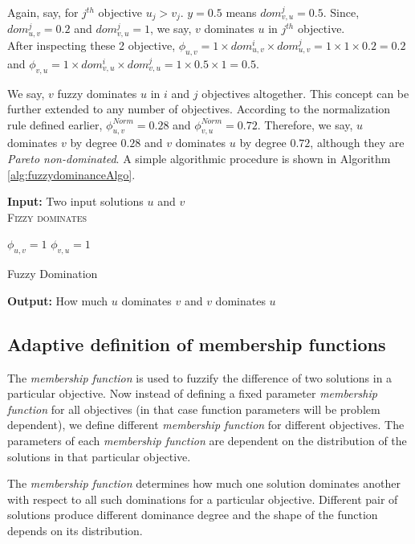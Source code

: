 \documentclass[journal]{IEEEtran}
\begin{document}
Again, say, for $j^{th}$ objective $u_j>v_j$. $y = 0.5$ means $dom_{v,u}^{j}=0.5$.
Since, $dom_{u,v}^{j}=0.2$ and $dom_{v,u}^{j}=1$, we say, $v$ dominates $u$ in $j^{th}$ objective.\\
After inspecting these 2 objective,
$\phi_{u,v} = 1\times dom_{u,v}^{i} \times dom_{u,v}^{j} = 1\times 1 \times 0.2 = 0.2$ and 
$\phi_{v,u} = 1\times dom_{v,u}^{i} \times dom_{v,u}^{j} = 1\times 0.5 \times 1 = 0.5$.

We say, $v$ fuzzy dominates $u$ in $i$ and $j$ objectives altogether. This concept can be further extended to any number of objectives. According to the normalization rule defined earlier, $\phi_{u,v}^{Norm} = 0.28$ and $\phi_{v,u}^{Norm} = 0.72$. Therefore, we say, $u$ dominates $v$ by degree $0.28$ and $v$ dominates $u$ by degree $0.72$, although they are \textit{Pareto non-dominated}. A simple algorithmic procedure is shown in Algorithm \ref{alg:fuzzydominanceAlgo}.

\begin{algorithm}[!h]
\textbf{Input:} Two input solutions $u$ and $v$\\
\textsc{Fizzy dominates}
\begin{algorithmic}[1]
 \STATE $\phi_{u,v}=1$
 \STATE $\phi_{v,u}=1$
 \ENDFOR
\end{algorithmic}
\caption{Fuzzy Domination}
\textbf{Output:} How much $u$ dominates $v$ and $v$ dominates $u$
\label{alg:fuzzydominanceAlgo}
\end{algorithm}

\subsection{Adaptive definition of membership functions}

The \textit{membership function} is used to fuzzify the difference of two solutions in a particular objective. Now instead of defining a fixed parameter \textit{membership function} for all objectives (in that case function parameters will be problem dependent), we define different \textit{membership function} for different objectives. The parameters of each \textit{membership function} are dependent on the distribution of the solutions in that particular objective.

The \textit{membership function} determines how much one solution dominates another with respect to all such dominations for a particular objective. Different pair of solutions produce different dominance degree and the shape of the function depends on its distribution.
\end{document}

